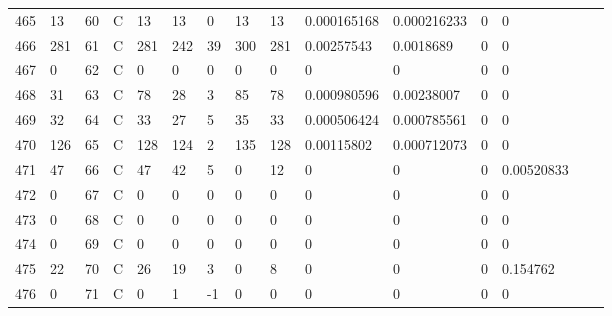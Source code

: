 \begin{longtable}{lllllllllllllll}
	465 & 13                & 60  & C   & 13                & 13                & 0                 & 13   & 13         & 0.000165168    & 0.000216233    & 0             & 0            \\
	466 & 281               & 61  & C   & 281               & 242               & 39                & 300  & 281        & 0.00257543     & 0.0018689      & 0             & 0            \\
	467 & 0                 & 62  & C   & 0                 & 0                 & 0                 & 0    & 0          & 0              & 0              & 0             & 0            \\
	468 & 31                & 63  & C   & 78                & 28                & 3                 & 85   & 78         & 0.000980596    & 0.00238007     & 0             & 0            \\
	469 & 32                & 64  & C   & 33                & 27                & 5                 & 35   & 33         & 0.000506424    & 0.000785561    & 0             & 0            \\
	470 & 126               & 65  & C   & 128               & 124               & 2                 & 135  & 128        & 0.00115802     & 0.000712073    & 0             & 0            \\
	471 & 47                & 66  & C   & 47                & 42                & 5                 & 0    & 12         & 0              & 0              & 0             & 0.00520833   \\
	472 & 0                 & 67  & C   & 0                 & 0                 & 0                 & 0    & 0          & 0              & 0              & 0             & 0            \\
	473 & 0                 & 68  & C   & 0                 & 0                 & 0                 & 0    & 0          & 0              & 0              & 0             & 0            \\
	474 & 0                 & 69  & C   & 0                 & 0                 & 0                 & 0    & 0          & 0              & 0              & 0             & 0            \\
	475 & 22                & 70  & C   & 26                & 19                & 3                 & 0    & 8          & 0              & 0              & 0             & 0.154762     \\
	476 & 0                 & 71  & C   & 0                 & 1                 & -1                & 0    & 0          & 0              & 0              & 0             & 0            \\

\end{longtable}
